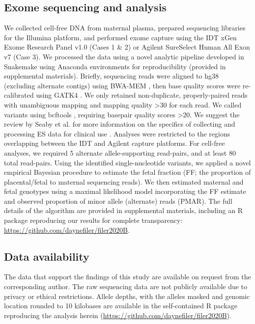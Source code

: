 \documentclass{article}\usepackage[]{graphicx}\usepackage[]{color}
\begin{document}
\subsection{Exome sequencing and analysis}
We collected cell-free DNA from maternal plasma, prepared sequencing libraries for the Illumina platform, and performed exome capture using the IDT xGen Exome Research Panel v1.0 (Cases 1 \& 2) or Agilent SureSelect Human All Exon v7 (Case 3).
We processed the data using a novel analytic pipeline developed in Snakemake \cite{koster:2012aa} using Anaconda environments for reproducibility (provided in supplemental materials).
Briefly, sequencing reads were aligned to hg38 (excluding alternate contigs) using BWA-MEM \cite{li:2013ab}, then base quality scores were re-calibrated using GATK4 \cite{mckenna:2010aa,van-der-auwera:2013aa,poplin:2018aa}.
We only retained non-duplicate, properly-paired reads with unambiguous mapping and mapping quality >30 for each read.
We called variants using bcftools \cite{li:2011aa}, requiring basepair quality scores >20.
We suggest the review by Seaby et al. for more information on the specifics of collecting and processing ES data for clinical use \cite{seaby:2016aa}.
Analyses were restricted to the regions overlapping between the IDT and Agilent capture platforms.
For cell-free analyses, we required 5 alternate allele-supporting read-pairs, and at least 80 total read-pairs.
Using the identified single-nucleotide variants, we applied a novel empirical Bayesian procedure to estimate the fetal fraction (FF; the proportion of placental/fetal to maternal sequencing reads).
We then estimated maternal and fetal genotypes using a maximal likelihood model incorporating the FF estimate and observed proportion of minor allele (alternate) reads (PMAR).
The full details of the algorithm are provided in supplemental materials, including an R \cite{r-core-team:2019aa} package reproducing our results for complete transparency: \url{https://github.com/daynefiler/filer2020B}.

\subsection{Data availability}
The data that support the findings of this study are available on request from the corresponding author.
The raw sequencing data are not publicly available due to privacy or ethical restrictions.
Allele depths, with the alleles masked and genomic location rounded to 10 kilobases are available in the self-contained R package reproducing the analysis herein (\url{https://github.com/daynefiler/filer2020B}).
\end{document}
